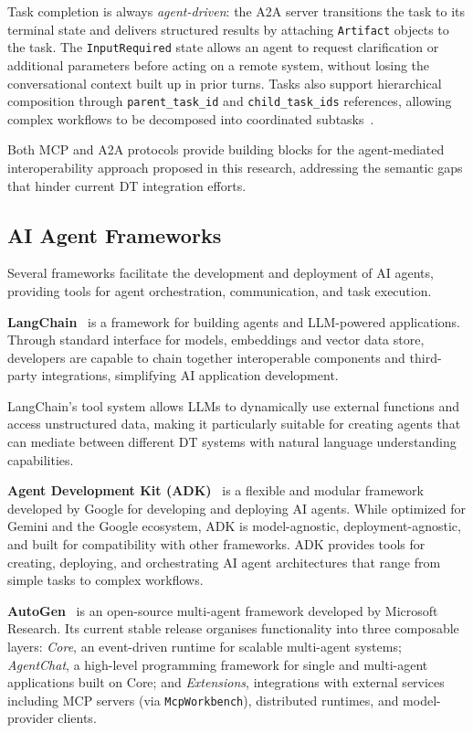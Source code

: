 Task completion is always \emph{agent-driven}:
    the A2A server transitions the task to its terminal state and
    delivers structured results by attaching \texttt{Artifact} objects to the task.
The \texttt{InputRequired} state allows an agent to request clarification or additional parameters before
    acting on a remote system, without losing the conversational context built up in prior turns.
Tasks also support hierarchical composition through \texttt{parent\_task\_id} and \texttt{child\_task\_ids} references,
    allowing complex workflows to be decomposed into coordinated subtasks~\cite{liu2025a}.

Both MCP and A2A protocols provide building blocks for the agent-mediated interoperability approach proposed in this research,
    addressing the semantic gaps that hinder current DT integration efforts.

\subsection{AI Agent Frameworks}
\label{subsec:ai-agent-frameworks}

Several frameworks facilitate the development and deployment of AI agents, providing tools for agent orchestration, communication, and task execution.

\textbf{LangChain}~\cite{LangChainOverview}
    is a framework for building agents and LLM-powered applications.
Through standard interface for models, embeddings and vector data store,
    developers are capable to chain together interoperable components and third-party integrations,
    simplifying AI application development. 

LangChain's tool system allows LLMs to dynamically use external functions and access unstructured data,
    making it particularly suitable for creating agents that can mediate between different DT systems with natural language understanding capabilities.

\textbf{Agent Development Kit (ADK)}~\cite{googleAgentDevelopmentKit}
    is a flexible and modular framework developed by Google for developing and deploying AI agents.
While optimized for Gemini and the Google ecosystem, ADK is model-agnostic, deployment-agnostic, and
    built for compatibility with other frameworks.
ADK provides tools for creating, deploying, and orchestrating AI agent architectures that range from simple tasks to complex workflows.

\textbf{AutoGen}~\cite{wu2024autogen}
    is an open-source multi-agent framework developed by Microsoft Research.
Its current stable release organises functionality into three composable layers:
    \emph{Core}, an event-driven runtime for scalable multi-agent systems;
    \emph{AgentChat}, a high-level programming framework for single and multi-agent
    applications built on Core; and
    \emph{Extensions}, integrations with external services including MCP servers
    (via \texttt{McpWorkbench}), distributed runtimes, and model-provider clients.


